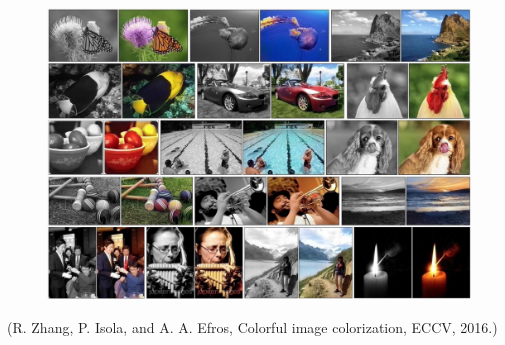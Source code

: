 \begin{example}
    \begin{figure}[H]
        \centering
        \includegraphics[width=1.0\textwidth]{.././assets/8.10.png}
    \end{figure}

    (R. Zhang, P. Isola, and A. A. Efros, Colorful image colorization, ECCV, 2016.)
\end{example}

